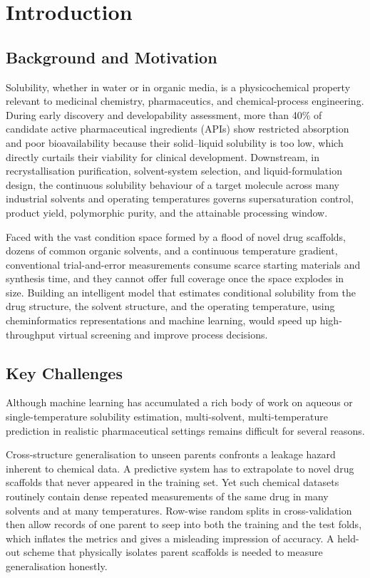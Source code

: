 \section{Introduction}

\subsection{Background and Motivation}

Solubility, whether in water or in organic media, is a physicochemical property relevant to medicinal chemistry, pharmaceutics, and chemical-process engineering. During early discovery and developability assessment, more than 40\% of candidate active pharmaceutical ingredients (APIs) show restricted absorption and poor bioavailability because their solid--liquid solubility is too low, which directly curtails their viability for clinical development\cite{delaney2004,solubility2024}. Downstream, in recrystallisation purification, solvent-system selection, and liquid-formulation design, the continuous solubility behaviour of a target molecule across many industrial solvents and operating temperatures governs supersaturation control, product yield, polymorphic purity, and the attainable processing window\cite{vermeire2022,fastsolv2025}.

Faced with the vast condition space formed by a flood of novel drug scaffolds, dozens of common organic solvents, and a continuous temperature gradient, conventional trial-and-error measurements consume scarce starting materials and synthesis time, and they cannot offer full coverage once the space explodes in size. Building an intelligent model that estimates conditional solubility from the drug structure, the solvent structure, and the operating temperature, using cheminformatics representations and machine learning, would speed up high-throughput virtual screening and improve process decisions\cite{boobier2020,ye2021}.

\subsection{Key Challenges}

Although machine learning has accumulated a rich body of work on aqueous or single-temperature solubility estimation\cite{delaney2004,solubility2024}, multi-solvent, multi-temperature prediction in realistic pharmaceutical settings remains difficult for several reasons.

Cross-structure generalisation to unseen parents confronts a leakage hazard inherent to chemical data. A predictive system has to extrapolate to novel drug scaffolds that never appeared in the training set. Yet such chemical datasets routinely contain dense repeated measurements of the same drug in many solvents and at many temperatures. Row-wise random splits in cross-validation then allow records of one parent to seep into both the training and the test folds, which inflates the metrics and gives a misleading impression of accuracy\cite{leakage2023,solubility2024}. A held-out scheme that physically isolates parent scaffolds is needed to measure generalisation honestly\cite{varma2006,cawley2010}.

